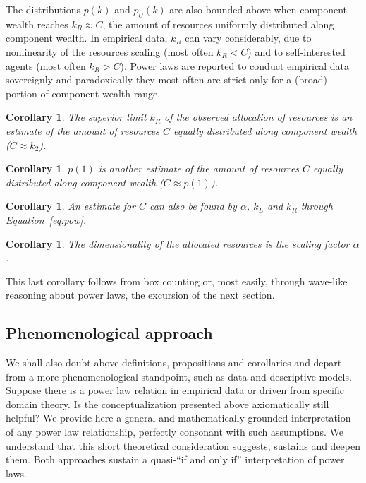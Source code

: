 \documentclass[a4paper, 11pt]{article} %
\newtheorem{corollary}[theorem2]{Corollary}
\begin{document}
The distributions $p(k)$ and $p_U(k)$ are also
bounded above when component wealth reaches $k_R \approx C$,
the amount of resources uniformly distributed along component wealth.
In empirical data, $k_R$ can vary considerably, due to
nonlinearity of the resources scaling (most often $k_R<C$) and
to self-interested agents (most often $k_R>C$).
Power laws are reported to conduct empirical data sovereignly and
paradoxically they most often are strict only for a
(broad) portion of component wealth range.


\begin{corollary}
	The superior limit $k_R$ of the observed allocation of resources is an estimate of the amount of resources $C$ equally distributed along component wealth ($C\approx k_2$).
\end{corollary}

\begin{corollary}
	$p(1)$ is another estimate of the amount of resources $C$ equally distributed along component wealth ($C\approx p(1)$).
\end{corollary}

\begin{corollary}
	An estimate for $C$ can also be found by $\alpha$, $k_L$ and $k_R$ through Equation~\ref{eq:pow}.
\end{corollary}

\begin{corollary}
	The dimensionality of the allocated resources is the scaling factor $\alpha$.
\end{corollary}

This last corollary follows from box counting or, most easily,
through wave-like reasoning about power laws,
the excursion of the next section.

\subsection{Phenomenological approach}\label{sec:phen}

We shall also
doubt above definitions, propositions and corollaries 
and depart from a more phenomenological standpoint,
such as data and descriptive models.
Suppose there is a power law relation in empirical data
or driven from specific domain theory.
Is the conceptualization
presented above axiomatically still helpful?
We provide here a general and mathematically grounded
interpretation of any power law relationship,
perfectly consonant with such assumptions.
We understand that this short theoretical consideration
suggests, sustains and deepen them.
Both approaches sustain a quasi-``if and only if''
interpretation of power laws.
\end{document}
